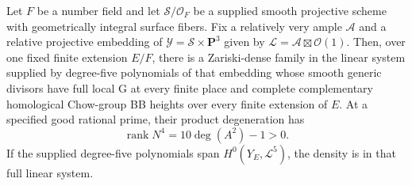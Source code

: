 \begin{theorem}
\label{r18sc:global-input}
Let $F$ be a number field and let
$\mathcal S/\mathcal O_F$ be a supplied
smooth projective scheme with geometrically
integral surface fibers.  Fix a relatively
very ample $\mathcal A$ and a relative
projective embedding of
$\mathcal Y=\mathcal S\times\mathbf P^3$
given by $\mathcal L=\mathcal A\boxtimes\mathcal O(1)$.
Then, over one fixed finite extension
$E/F$, there is a Zariski-dense family
in the linear system supplied by degree-five
polynomials of that embedding whose smooth
generic divisors have full local G at every
finite place and complete complementary
homological Chow-group BB heights over
every finite extension of $E$.
At a specified good rational prime,
their product degeneration has
\[
                         \operatorname{rank}N^4=10\deg(A^2)-1>0.
 \tag{SC18.9}\label{r18sc:global-monodromy}
\]
If the supplied degree-five polynomials
span $H^0(Y_E,\mathcal L^5)$, the density
is in that full linear system.
\end{theorem}

